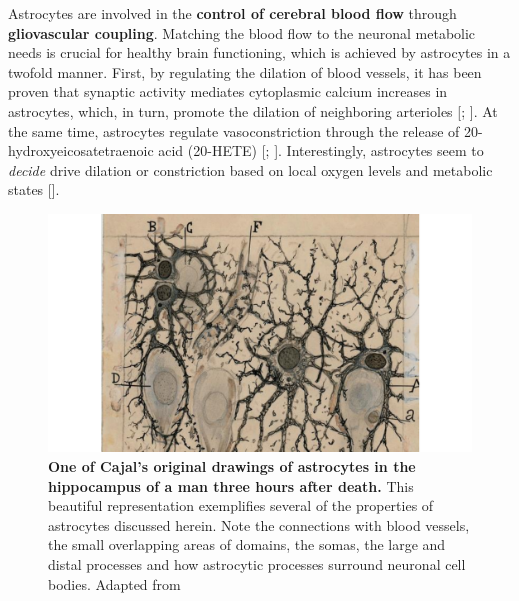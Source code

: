 Astrocytes are involved in the \textbf{control of cerebral blood flow} through \textbf{gliovascular coupling}.
Matching the blood flow to the neuronal metabolic needs is crucial for healthy brain functioning, which is achieved by astrocytes in a twofold manner. 
First, by regulating the dilation of blood vessels, it has been proven that synaptic activity mediates cytoplasmic calcium increases in astrocytes, which, in turn, promote the dilation of neighboring arterioles [\cite{zonta2003}; \cite{attwell2010}].
At the same time, astrocytes regulate vasoconstriction through the release of 20-hydroxyeicosatetraenoic acid (20-HETE) [\cite{metea2006}; \cite{attwell2010}].
Interestingly, astrocytes seem to \textit{decide} drive dilation or constriction based on local oxygen levels and metabolic states [\cite{macvicar2015}]. 
\begin{figure}
    \centering
    \includegraphics[width=\textwidth]{Figures/Chapter1/intro_fig_astro_cajal.pdf}
    \caption[Cajal's drawing of astrocytes]{\textbf{One of Cajal's original drawings of astrocytes in the hippocampus of a man three hours after death.} This beautiful representation exemplifies several of the properties of astrocytes discussed herein. Note the connections with blood vessels, the small overlapping areas of domains, the somas, the large and distal processes and how astrocytic processes surround neuronal cell bodies.
    Adapted from \cite{swanson2017beautiful}}
    \label{fig:chap1:astro_anatomy_cajal}
\end{figure}

